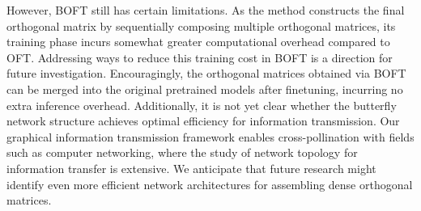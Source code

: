 However, BOFT still has certain limitations. As the method constructs the final orthogonal matrix by sequentially composing multiple orthogonal matrices, its training phase incurs somewhat greater computational overhead compared to OFT. Addressing ways to reduce this training cost in BOFT is a direction for future investigation. Encouragingly, the orthogonal matrices obtained via BOFT can be merged into the original pretrained models after finetuning, incurring no extra inference overhead. Additionally, it is not yet clear whether the butterfly network structure achieves optimal efficiency for information transmission. Our graphical information transmission framework enables cross-pollination with fields such as computer networking, where the study of network topology for information transfer is extensive. We anticipate that future research might identify even more efficient network architectures for assembling dense orthogonal matrices.

